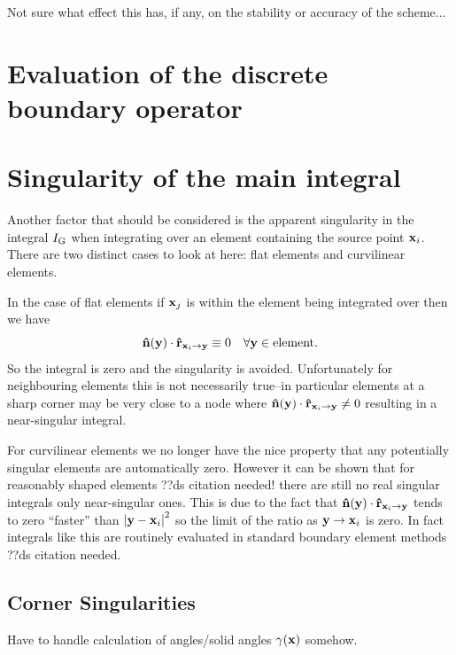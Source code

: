 Not sure what effect this has, if any, on the stability or accuracy of the scheme...

\section{Evaluation of the discrete boundary operator}
\label{sec:calc-integr-i_bm}

\section{Singularity of the main integral}
\label{sec:bem-singularity}

Another factor that should be considered is the apparent singularity in the integral $I_{\mathbf{\mathrm{G}}}$ when integrating over an element containing the source point $\mathbf{x}_{i}$.
There are two distinct cases to look at here: flat elements and curvilinear elements.

In the case of flat elements if $\mathbf{x}_{j}$ is within the element being integrated over then we have
\begin{equation}
  \label{eq:7}
  \mathbf{\hat{n}}(\mathbf{y}) \cdot \mathbf{\hat{r}}_{\mathbf{x}_{{i}} \rightarrow \mathbf{y}} \equiv 0 \quad \forall \mathbf{y} \in \text{element}.
\end{equation}
So the integral is zero and the singularity is avoided.
Unfortunately for neighbouring elements this is not necessarily true--in particular elements at a sharp corner may be very close to a node where $\mathbf{\hat{n}}(\mathbf{y}) \cdot \mathbf{\hat{r}}_{\mathbf{x}_{{i}} \rightarrow \mathbf{y}} \neq 0$ resulting in a near-singular integral.

For curvilinear elements we no longer have the nice property that any potentially singular elements are automatically zero.
However it can be shown that for reasonably shaped elements ??ds citation needed! there are still no real singular integrals only near-singular ones.
This is due to the fact that $\mathbf{\hat{n}}(\mathbf{y}) \cdot \mathbf{\hat{r}}_{\mathbf{x}_{{i}} \rightarrow \mathbf{y}}$ tends to zero ``faster'' than $\left|{\mathbf{y} - \mathbf{x}_{i}} \right|^2$ so the limit of the ratio as $\mathbf{y} \rightarrow \mathbf{x}_{i}$ is zero.
In fact integrals like this are routinely evaluated in standard boundary element methods ??ds citation needed.


\subsection{Corner Singularities}

Have to handle calculation of angles/solid angles $\gamma(\mathbf{x})$ somehow.

